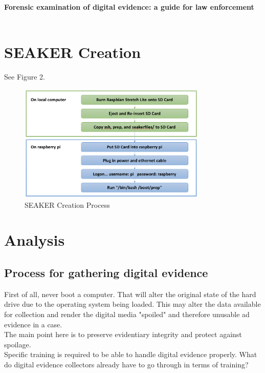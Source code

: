 \documentclass[12pt]{article}
\begin{document}
\textbf{Forensic examination of digital evidence: a guide for law enforcement \cite{hart2004forensic}}\\
\\
\vspace{0.5 cm}

\section{SEAKER Creation}
\label{sect-Creation}
See Figure 2.
  \begin{figure}[h]
    \centering
      \includegraphics[width=0.8\textwidth]{SeakerCreation.png}
    \caption{SEAKER Creation Process}
  \end{figure}

\section{Analysis}
\label{sect-analysis}

\subsection{Process for gathering digital evidence}

First of all, never boot a computer.  That will alter the original state of the hard drive due to the operating
system being loaded.  This may alter the data available for collection and render the digital media "spoiled" and
therefore unusable ad evidence in a case.\\

The main point here is to preserve evidentiary integrity and protect against spoilage.\\

Specific training is required to be able to handle digital evidence properly.  What do digital evidence collectors
already have to go through in terms of training?\\
\end{document}
